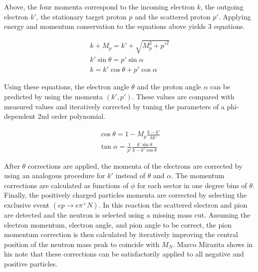 Above, the four momenta correspond to the incoming electron $k$, the outgoing electron $k'$, the stationary target proton $p$ and the scattered proton $p'$. Applying energy and momentum conservation to the equations above yields 3 equations.

\begin{gather}
	k + M_p = k' + \sqrt{M_{p}^{2} + p'^2} \\
	k'\sin\theta = p'\sin\alpha            \\
	k = k'\cos\theta + p'\cos\alpha  
\end{gather}

Using these equations, the electron angle $\theta$ and the proton angle $\alpha$ can be predicted by using the momenta $(k',p')$.  These values are compared with measured values and iteratively corrected by tuning the parameters of a phi-dependent 2nd order polynomial.

\begin{gather}
	\cos\theta = 1 - M_p \frac{k-k'}{kk'} \\
	\tan\alpha = \frac{1}{p'} \frac{k'\sin\theta}{k-k'\cos\theta}
\end{gather}

After $\theta$ corrections are applied, the momenta of the electrons are corrected by using an analogous procedure for $k'$ instead of $\theta$ and $\alpha$.  The momentum corrections are calculated as functions of $\phi$ for each sector in one degree bins of $\theta$.  Finally, the positively charged particles momenta are corrected by selecting the exclusive event $(ep \rightarrow e\pi^+N)$.  In this reaction the scattered electron and pion are detected and the neutron is selected using a missing mass cut.  Assuming the electron momentum, electron angle, and pion angle to be correct, the pion momentum correction is then calculated by iteratively improving the central position of the neutron mass peak to coincide with $M_{N}$.  Marco Mirazita shows in his note that these corrections can be satisfactorily applied to all negative and positive particles.



